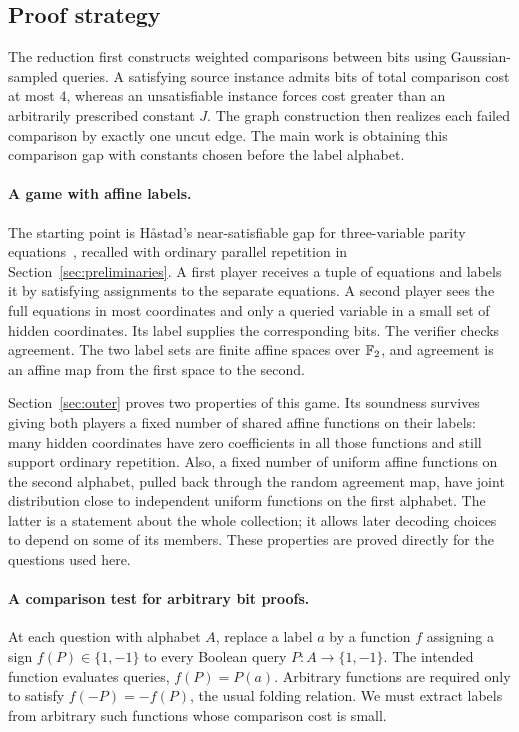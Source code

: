 \subsection{Proof strategy}

The reduction first constructs weighted comparisons between bits using
Gaussian-sampled queries. A satisfying source instance admits bits of total comparison
cost at most $4$, whereas an unsatisfiable instance forces cost greater than
an arbitrarily prescribed constant $J$. The graph construction then realizes
each failed comparison by exactly one uncut edge. The main work is obtaining
this comparison gap with constants chosen before the label alphabet.

\paragraph{A game with affine labels.}
The starting point is H\aa stad's near-satisfiable gap for three-variable
parity equations~\cite{Hastad2001}, recalled with ordinary parallel
repetition in Section~\ref{sec:preliminaries}. A first player receives a tuple
of equations and labels it by satisfying assignments to the separate
equations. A second player sees the full equations in most coordinates and
only a queried variable in a small set of hidden coordinates. Its label
supplies the corresponding bits. The verifier checks agreement. The two
label sets are finite affine spaces over $\mathbb F_2$, and agreement is an affine
map from the first space to the second.

Section~\ref{sec:outer} proves two properties of this game. Its soundness
survives giving both players a fixed number of shared affine functions on
their labels: many hidden coordinates have zero coefficients in all those
functions and still support ordinary repetition. Also, a fixed number of
uniform affine functions on the second alphabet, pulled back through the
random agreement map, have joint distribution close to independent uniform
functions on the first alphabet. The latter is a statement about the whole
collection; it allows later decoding choices to depend on some of its
members. These properties are proved directly for the questions used here.

\paragraph{A comparison test for arbitrary bit proofs.}
At each question with alphabet $A$, replace a label $a$ by a function
$f$ assigning a sign $f(P)\in\{1,-1\}$ to every Boolean query
$P:A\to\{1,-1\}$. The intended function evaluates
queries, $f(P)=P(a)$. Arbitrary functions are required only to satisfy
$f(-P)=-f(P)$, the usual folding relation. We must extract labels from
arbitrary such functions whose comparison cost is small.

